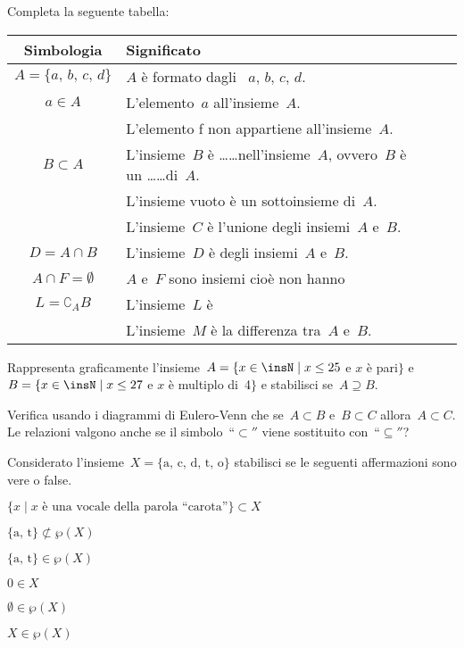 \begin{esercizio}
\label{ese:\thechapter.115}
Completa la seguente tabella:

\begin{tabular*}{.9\textwidth}{@{\extracolsep{\fill}}*{2}{cl}}
\toprule
Simbologia & Significato\\
\midrule
$A=\{a\text{, }b\text{, }c\text{, }d\}$ & $A$ è formato dagli \dotfill~$a\text{, }b\text{, }c\text{, }d$.\\
$a\in A$ & L'elemento~$a$ \dotfill all'insieme~$A$.\\
\dotfill & L'elemento f non appartiene all'insieme~$A$.\\
$B\subset A$ & L'insieme~$B$ è \ldots\ldots nell'insieme~$A$, ovvero~$B$ è un \ldots\ldots di~$A$.\\
\dotfill & L'insieme vuoto è un sottoinsieme di~$A$.\\
\dotfill & L'insieme~$C$ è l'unione degli insiemi~$A$ e~$B$.\\
$D=A\cap B$ & L'insieme~$D$ è \dotfill degli insiemi~$A$ e~$B$.\\
$A\cap F=\emptyset $& $A$ e~$F$ sono insiemi \dotfill cioè non hanno \dotfill \\
$L=\complement_{A}B$ & L'insieme~$L$ è \dotfill \\
\dotfill & L'insieme~$M$ è la differenza tra~$A$ e~$B$.\\
\bottomrule
\end{tabular*}
\end{esercizio}

\begin{esercizio}
\label{ese:\thechapter.116}
Rappresenta graficamente l'insieme~$A=\{x\in\insN\mid x\le 25$ e $x$ è pari$\}$ e
$B=\{x\in\insN\mid x\le 27$ e $x$ è multiplo di~4$\}$ e stabilisci se~$A\supseteq B$.
\end{esercizio}

\begin{esercizio}
\label{ese:\thechapter.117}
Verifica usando i diagrammi di Eulero-Venn che se~$A\subset B$ e~$B\subset C$ allora~$A\subset C$. Le relazioni valgono
anche se il simbolo~``${\subset}''$ viene sostituito con~``${\subseteq}''$?
\end{esercizio}

\begin{esercizio}
\label{ese:\thechapter.118}
Considerato l'insieme~$X=\{\text{a, c, d, t, o}\}$ stabilisci se le seguenti affermazioni sono vere o false.

\TabPositions{8cm}
\begin{enumeratea}
\item $\{x\mid x\text{ è una vocale della parola ``carota''}\} \subset X$ \tab\boxV\quad\boxF
\item $\{\text{a, t}\}\not\subset \wp (X)$ \tab\boxV\quad\boxF
\item $\{\text{a, t}\}\in \wp (X)$ \tab\boxV\quad\boxF
\item $0\in X$ \tab\boxV\quad\boxF
\item $\emptyset \in \wp (X)$ \tab\boxV\quad\boxF
\item $X\in \wp (X)$ \tab\boxV\quad\boxF
\end{enumeratea}
\end{esercizio}

